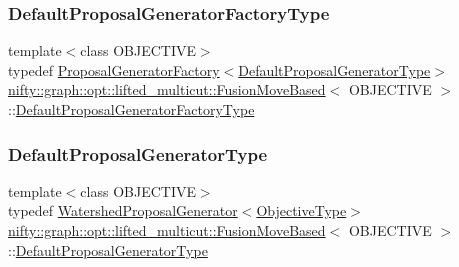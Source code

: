\subsubsection{\texorpdfstring{Default\+Proposal\+Generator\+Factory\+Type}{DefaultProposalGeneratorFactoryType}}
{\footnotesize\ttfamily template$<$class O\+B\+J\+E\+C\+T\+I\+VE$>$ \\
typedef \hyperlink{classnifty_1_1graph_1_1opt_1_1lifted__multicut_1_1ProposalGeneratorFactory}{Proposal\+Generator\+Factory}$<$\hyperlink{classnifty_1_1graph_1_1opt_1_1lifted__multicut_1_1FusionMoveBased_ad824c6089be2b3f313bf4d3c9f1e285f}{Default\+Proposal\+Generator\+Type}$>$ \hyperlink{classnifty_1_1graph_1_1opt_1_1lifted__multicut_1_1FusionMoveBased}{nifty\+::graph\+::opt\+::lifted\+\_\+multicut\+::\+Fusion\+Move\+Based}$<$ O\+B\+J\+E\+C\+T\+I\+VE $>$\+::\hyperlink{classnifty_1_1graph_1_1opt_1_1lifted__multicut_1_1FusionMoveBased_a447cad3928bd98e925a5beca919790f7}{Default\+Proposal\+Generator\+Factory\+Type}}

\mbox{\label{classnifty_1_1graph_1_1opt_1_1lifted__multicut_1_1FusionMoveBased_ad824c6089be2b3f313bf4d3c9f1e285f}} 
\subsubsection{\texorpdfstring{Default\+Proposal\+Generator\+Type}{DefaultProposalGeneratorType}}
{\footnotesize\ttfamily template$<$class O\+B\+J\+E\+C\+T\+I\+VE$>$ \\
typedef \hyperlink{classnifty_1_1graph_1_1opt_1_1lifted__multicut_1_1WatershedProposalGenerator}{Watershed\+Proposal\+Generator}$<$\hyperlink{classnifty_1_1graph_1_1opt_1_1lifted__multicut_1_1FusionMoveBased_a9cb2fb9caff3dac87f0d43cf757e676c}{Objective\+Type}$>$ \hyperlink{classnifty_1_1graph_1_1opt_1_1lifted__multicut_1_1FusionMoveBased}{nifty\+::graph\+::opt\+::lifted\+\_\+multicut\+::\+Fusion\+Move\+Based}$<$ O\+B\+J\+E\+C\+T\+I\+VE $>$\+::\hyperlink{classnifty_1_1graph_1_1opt_1_1lifted__multicut_1_1FusionMoveBased_ad824c6089be2b3f313bf4d3c9f1e285f}{Default\+Proposal\+Generator\+Type}}

